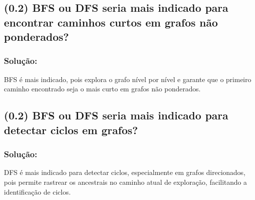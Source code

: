 \documentclass{article}
\begin{document}
  \subsection {(0.2) BFS ou DFS seria mais indicado para encontrar 
  caminhos curtos em grafos não ponderados?}
  \subsubsection{Solução:}
  BFS é mais indicado, pois explora o grafo nível por nível e 
  garante que o primeiro caminho encontrado seja o mais curto em 
  grafos não ponderados.

  \subsection {(0.2) BFS ou DFS seria mais indicado para detectar 
  ciclos em grafos?}
  \subsubsection{Solução:}
  DFS é mais indicado para detectar ciclos, especialmente em 
  grafos direcionados, pois permite rastrear os ancestrais no 
  caminho atual de exploração, facilitando a identificação de 
  ciclos.
\end{document}
